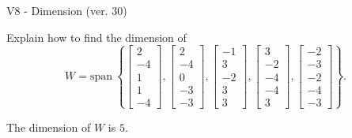 \begin{exercise}
  \begin{exerciseTitle}V8 - Dimension (ver. 30)\end{exerciseTitle}
  \begin{exerciseStatement}
    Explain how to find the dimension of 
\[W=\mathrm{span}\ \left\{\left[\begin{array}{r}
2 \\
-4 \\
1 \\
1 \\
-4
\end{array}\right] , \left[\begin{array}{r}
2 \\
-4 \\
0 \\
-3 \\
-3
\end{array}\right] , \left[\begin{array}{r}
-1 \\
3 \\
-2 \\
3 \\
3
\end{array}\right] , \left[\begin{array}{r}
3 \\
-2 \\
-4 \\
-4 \\
3
\end{array}\right] , \left[\begin{array}{r}
-2 \\
-3 \\
-2 \\
-4 \\
-3
\end{array}\right]\right\}.\]



  \end{exerciseStatement}
  \begin{exerciseAnswer}
   The dimension of \(W\) is  \(5\).
  


  \end{exerciseAnswer}
\end{exercise}